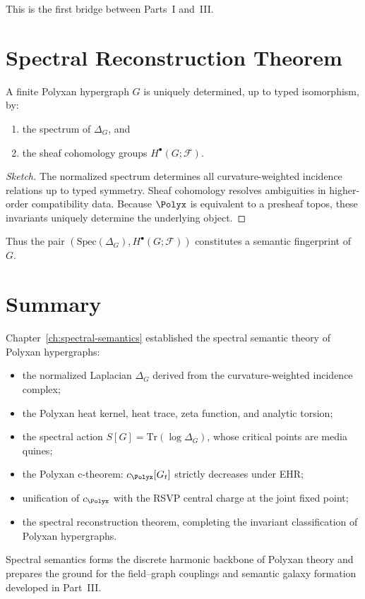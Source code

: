 This is the first bridge between Parts~I and~III.

\section{Spectral Reconstruction Theorem}

\begin{theorem}
A finite Polyxan hypergraph $G$ is uniquely determined, up to typed isomorphism,
by:
\begin{enumerate}
  \item the spectrum of $\Delta_G$, and  
  \item the sheaf cohomology groups $H^\bullet(G;\mathscr{F})$.
\end{enumerate}
\end{theorem}

\begin{proof}[Sketch]
The normalized spectrum determines all curvature-weighted incidence relations
up to typed symmetry.  
Sheaf cohomology resolves ambiguities in higher-order compatibility data.  
Because $\Polyx$ is equivalent to a presheaf topos, these invariants uniquely
determine the underlying object.
\end{proof}

Thus the pair $(\mathrm{Spec}(\Delta_G), H^\bullet(G;\mathscr{F}))$ constitutes a
semantic fingerprint of $G$.

\section{Summary}

Chapter~\ref{ch:spectral-semantics} established the spectral semantic theory of
Polyxan hypergraphs:

\begin{itemize}
  \item the normalized Laplacian $\Delta_G$ derived from the curvature-weighted
        incidence complex;
  \item the Polyxan heat kernel, heat trace, zeta function, and analytic torsion;
  \item the spectral action $S[G]=\mathrm{Tr}(\log\Delta_G)$, whose critical
        points are media quines;
  \item the Polyxan c-theorem: $c_{\Polyx}[G_t]$ strictly decreases under EHR;
  \item unification of $c_{\Polyx}$ with the RSVP central charge at the joint
        fixed point;
  \item the spectral reconstruction theorem, completing the invariant
        classification of Polyxan hypergraphs.
\end{itemize}

Spectral semantics forms the discrete harmonic backbone of Polyxan theory and
prepares the ground for the field–graph couplings and semantic galaxy formation
developed in Part~III.

